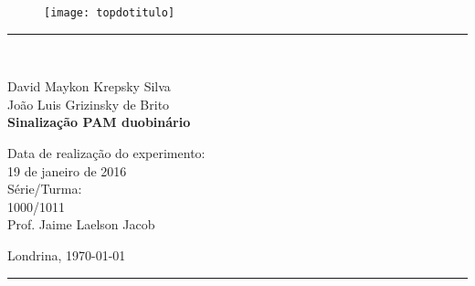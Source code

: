 \begin{titlepage}
\begin{center}
\begin{figure}[h]
\texttt{[image: topdotitulo]}
\end{figure}
\rule{\columnwidth}{1.5mm}
\

\large David Maykon Krepsky Silva \\
\large João Luis Grizinsky de Brito \\

\vspace{4cm}
{\bf \Large Sinalização PAM duobinário}
\vspace{3.5cm}

\begin{flushright}
Data de realização do experimento:\\
19 de janeiro de 2016\\
Série/Turma:\\
1000/1011\\
Prof. Jaime Laelson Jacob
\end{flushright}

\vspace{3.2cm}
Londrina, \today

\rule{\columnwidth}{1.3mm}
\end{center}
\end{titlepage}